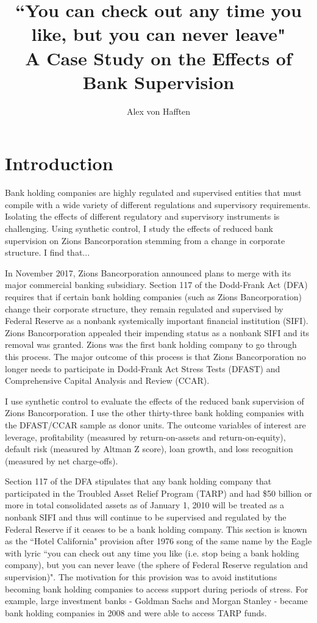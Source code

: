 \documentclass{article}
\title{``You can check out any time you like, but you can never leave" \\ A Case Study on the Effects of Bank Supervision}
\author{Alex von Hafften}
\begin{document}
\maketitle

\doublespacing

\section{Introduction}

Bank holding companies are highly regulated and supervised entities that must compile with a wide variety of different regulations and supervisory requirements. Isolating the effects of different regulatory and supervisory instruments is challenging. Using synthetic control, I study the effects of reduced bank supervision on Zions Bancorporation stemming from a change in corporate structure.  I find that...

In November 2017, Zions Bancorporation announced plans to merge with its major commercial banking subsidiary.  Section 117 of the Dodd-Frank Act (DFA) requires that if certain bank holding companies (such as Zions Bancorporation) change their corporate structure, they remain regulated and supervised by Federal Reserve as a nonbank systemically important financial institution (SIFI). Zions Bancorporation appealed their impending status as a nonbank SIFI and its removal was granted. Zions was the first bank holding company to go through this process. The major outcome of this process is that Zions Bancorporation no longer needs to participate in Dodd-Frank Act Stress Tests (DFAST) and Comprehensive Capital Analysis and Review (CCAR).

I use synthetic control to evaluate the effects of the reduced bank supervision of Zions Bancorporation. I use the other thirty-three bank holding companies with the DFAST/CCAR sample as donor units. The outcome variables of interest are leverage, profitability (measured by return-on-assets and return-on-equity), default risk (measured by Altman Z score), loan growth, and loss recognition (measured by net charge-offs).

Section 117 of the DFA stipulates that any bank holding company that participated in the Troubled Asset Relief Program (TARP) and had \$50 billion or more in total consolidated assets as of January 1, 2010 will be treated as a nonbank SIFI and thus will continue to be supervised and regulated by the Federal Reserve if it ceases to be a bank holding company.  This section is known as the ``Hotel California" provision after 1976 song of the same name by the Eagle with lyric ``you can check out any time you like (i.e. stop being a bank holding company), but you can never leave (the sphere of Federal Reserve regulation and supervision)".  The motivation for this provision was to avoid institutions becoming bank holding companies to access support during periods of stress.  For example, large investment banks - Goldman Sachs and Morgan Stanley - became bank holding companies in 2008 and were able to access TARP funds.
\end{document}

